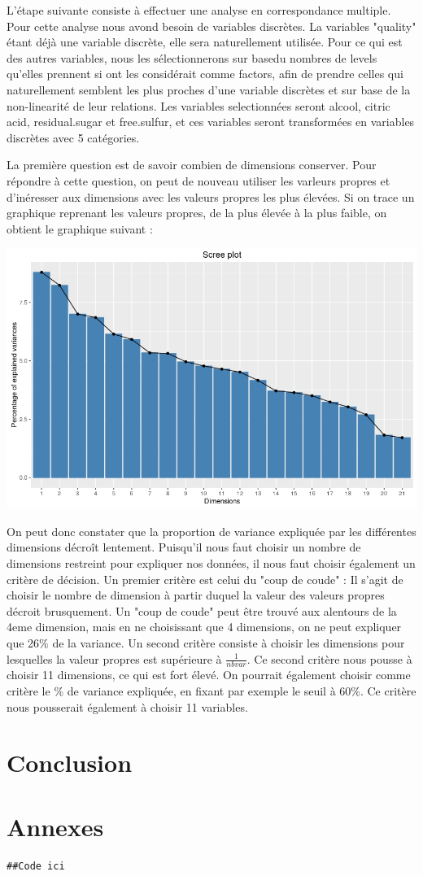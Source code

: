 \documentclass[11pt,a4paper]{article}
\begin{document}
L'étape suivante consiste à effectuer une analyse en correspondance multiple. Pour cette analyse nous avond besoin de variables discrètes. La variables "quality" étant déjà une variable discrète, elle sera naturellement utilisée. Pour ce qui est des autres variables, nous les sélectionnerons sur basedu nombres de levels qu'elles prennent si ont les considérait comme factors, afin de prendre celles qui naturellement semblent les plus proches d'une variable discrètes et sur base de la non-linearité de leur relations. Les variables selectionnées seront alcool, citric acid, residual.sugar et free.sulfur, et ces variables seront transformées en variables discrètes avec 5 catégories.

La première question est de savoir combien de  dimensions conserver. Pour répondre à cette question, on peut de nouveau utiliser les varleurs propres et d'inéresser aux dimensions avec les valeurs propres les plus élevées. Si on trace un graphique reprenant les valeurs propres, de la plus élevée à la plus faible, on obtient le graphique suivant : 

\begin{center}
\includegraphics[scale=0.5]{"mca-eigen"}
\end{center}

On peut donc constater que la proportion de variance expliquée par les différentes dimensions décroît lentement. Puisqu'il nous faut choisir un nombre de dimensions restreint pour expliquer nos données, il nous faut choisir également un critère de décision. Un premier critère est celui du "coup de coude" : Il s'agit de choisir le nombre de dimension à partir duquel la valeur des valeurs propres décroit brusquement. Un "coup de coude" peut être trouvé aux alentours de la 4eme dimension, mais en ne choisissant que 4 dimensions, on ne peut expliquer que 26\% de la variance. Un second critère consiste à choisir les dimensions pour lesquelles la valeur propres est supérieure à $\frac{1}{nbvar}$. Ce second critère nous pousse à choisir 11 dimensions, ce qui est fort élevé. On pourrait également choisir comme critère le \% de variance expliquée, en fixant par exemple le seuil à 60\%. Ce critère nous pousserait également à choisir 11 variables.
\section{Conclusion}


\section{Annexes}

\lstset{language=R}
\begin{lstlisting}[breaklines]
##Code ici
\end{lstlisting}
\end{document}
